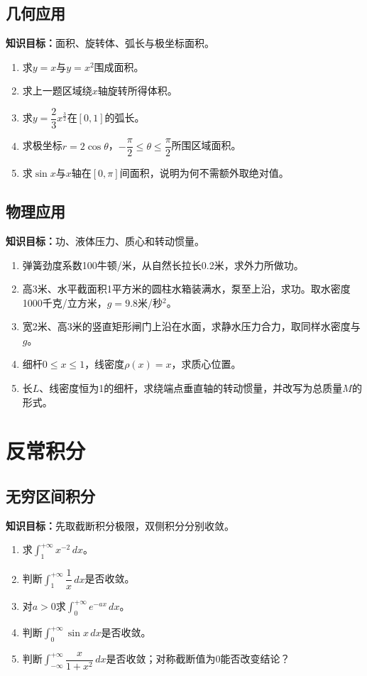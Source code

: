 \documentclass[11pt,a4paper,fontset=fandol]{ctexrep}
\newcommand{\goal}[1]{\textbf{知识目标：}#1\par}
\begin{document}
\subsection{几何应用}
\goal{面积、旋转体、弧长与极坐标面积。}
\begin{enumerate}
\item 求$y=x$与$y=x^2$围成面积。
\item 求上一题区域绕$x$轴旋转所得体积。
\item 求$y=\dfrac{2}{3}x^{\frac32}$在$[0,1]$的弧长。
\item 求极坐标$r=2\cos\theta$，$-\dfrac{\pi}{2}\le\theta\le\dfrac{\pi}{2}$所围区域面积。
\item 求$\sin x$与$x$轴在$[0,\pi]$间面积，说明为何不需额外取绝对值。
\end{enumerate}
\subsection{物理应用}
\goal{功、液体压力、质心和转动惯量。}
\begin{enumerate}
\item 弹簧劲度系数100牛顿/米，从自然长拉长0.2米，求外力所做功。
\item 高3米、水平截面积1平方米的圆柱水箱装满水，泵至上沿，求功。取水密度1000千克/立方米，$g=9.8$米/秒$^2$。
\item 宽2米、高3米的竖直矩形闸门上沿在水面，求静水压力合力，取同样水密度与$g$。
\item 细杆$0\le x\le1$，线密度$\rho(x)=x$，求质心位置。
\item 长$L$、线密度恒为1的细杆，求绕端点垂直轴的转动惯量，并改写为总质量$M$的形式。
\end{enumerate}
\section{反常积分}
\subsection{无穷区间积分}
\goal{先取截断积分极限，双侧积分分别收敛。}
\begin{enumerate}
\item 求$\int_1^{+\infty}x^{-2}\,dx$。
\item 判断$\int_1^{+\infty}\dfrac{1}{x}\,dx$是否收敛。
\item 对$a>0$求$\int_0^{+\infty}e^{-ax}\,dx$。
\item 判断$\int_0^{+\infty}\sin x\,dx$是否收敛。
\item 判断$\int_{-\infty}^{+\infty}\dfrac{x}{1+x^2}\,dx$是否收敛；对称截断值为0能否改变结论？
\end{enumerate}
\end{document}
